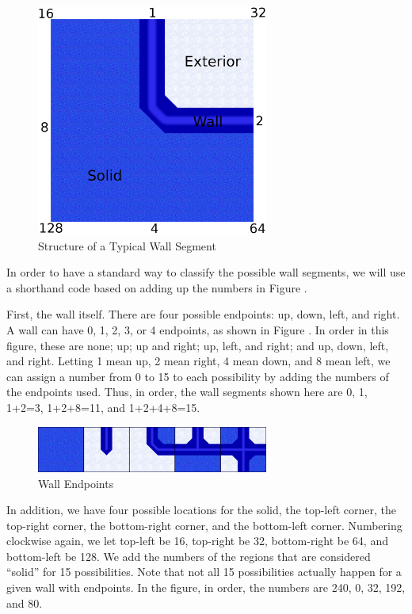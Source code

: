 \documentclass[12pt]{amsbook}
\theoremstyle{definition}
\theoremstyle{remark}
\numberwithin{figure}{chapter}
\numberwithin{table}{chapter}
\numberwithin{section}{chapter}
\numberwithin{equation}{section}
\begin{document}
\begin{figure}[h]
  \includegraphics[width=3in]{WallSegment.png}
  \caption{Structure of a Typical Wall Segment}
  \label{fig:wall-segment}
\end{figure}

In order to have a standard way to classify the possible wall segments, we will use a shorthand code based on adding up the numbers in Figure \label{fig:wall-segment}.  

First, the wall itself.  There are four possible endpoints: up, down, left, and right.  A wall can have 0, 1, 2, 3, or 4 endpoints, as shown in Figure \label{fig:wall-endpoints}.  In order in this figure, these are none; up; up and right; up, left, and right; and up, down, left, and right.  Letting 1 mean up, 2 mean right, 4 mean down, and 8 mean left, we can assign a number from 0 to 15 to each possibility by adding the numbers of the endpoints used.  Thus, in order, the wall segments shown here are 0, 1, 1+2=3, 1+2+8=11, and 1+2+4+8=15.  

\begin{figure}[h]
  \includegraphics[width=3in]{WallEndpoints.png}
  \caption{Wall Endpoints}
  \label{fig:wall-endpoints}
\end{figure}

In addition, we have four possible locations for the solid, the top-left corner, the top-right corner, the bottom-right corner, and the bottom-left corner.  Numbering clockwise again, we let top-left be 16, top-right be 32, bottom-right be 64, and  bottom-left be 128.  We add the numbers of the regions that are considered ``solid'' for 15 possibilities.  Note that not all 15 possibilities actually happen for a given wall with endpoints.  In the figure, in order, the numbers are 240, 0, 32, 192, and 80. 
\end{document}
